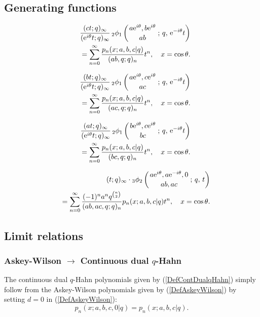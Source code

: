 \documentclass[envcountchap,graybox]{svmono}
\newcounter{rom}
\newcommand{\qhyp}[5]{\mbox{}_{#1}{\phi}_{#2}
\left(\genfrac{}{}{0pt}{}{#3}{#4}\,;\,q,\,#5\right)}
\newcommand{\e}{\textrm{e}}
\begin{document}
\subsection*{Generating functions}
\begin{eqnarray}
\label{GenContDualqHahn1}
& &\frac{(ct;q)_{\infty}}{(\e^{i\theta}t;q)_{\infty}}\,
\qhyp{2}{1}{a\e^{i\theta},b\e^{i\theta}}{ab}{\e^{-i\theta}t}\nonumber\\
& &{}=\sum_{n=0}^{\infty}\frac{p_n(x;a,b,c|q)}{(ab,q;q)_n}t^n,
\quad x=\cos\theta.
\end{eqnarray}

\begin{eqnarray}
\label{GenContDualqHahn2}
& &\frac{(bt;q)_{\infty}}{(\e^{i\theta}t;q)_{\infty}}\,
\qhyp{2}{1}{a\e^{i\theta},c\e^{i\theta}}{ac}{\e^{-i\theta}t}\nonumber\\
& &{}=\sum_{n=0}^{\infty}\frac{p_n(x;a,b,c|q)}{(ac,q;q)_n}t^n,
\quad x=\cos\theta.
\end{eqnarray}

\begin{eqnarray}
\label{GenContDualqHahn3}
& &\frac{(at;q)_{\infty}}{(\e^{i\theta}t;q)_{\infty}}\,
\qhyp{2}{1}{b\e^{i\theta},c\e^{i\theta}}{bc}{\e^{-i\theta}t}\nonumber\\
& &{}=\sum_{n=0}^{\infty}\frac{p_n(x;a,b,c|q)}{(bc,q;q)_n}t^n,
\quad x=\cos\theta.
\end{eqnarray}

\begin{eqnarray}
& &\label{GenContDualqHahn4}
(t;q)_{\infty}\cdot\qhyp{3}{2}{a\e^{i\theta},a\e^{-i\theta},0}{ab,ac}{t}\nonumber\\
& &{}=\sum_{n=0}^{\infty}\frac{(-1)^na^nq^{\binom{n}{2}}}{(ab,ac,q;q)_n}
p_n(x;a,b,c|q)t^n,\quad x=\cos\theta.
\end{eqnarray}

\subsection*{Limit relations}

\subsubsection*{Askey-Wilson $\rightarrow$ Continuous dual $q$-Hahn}
The continuous dual $q$-Hahn polynomials given by (\ref{DefContDualqHahn}) simply follow
from the Askey-Wilson polynomials given by (\ref{DefAskeyWilson}) by setting
$d=0$ in (\ref{DefAskeyWilson}):
$$p_n(x;a,b,c,0|q)=p_n(x;a,b,c|q).$$
\end{document}
